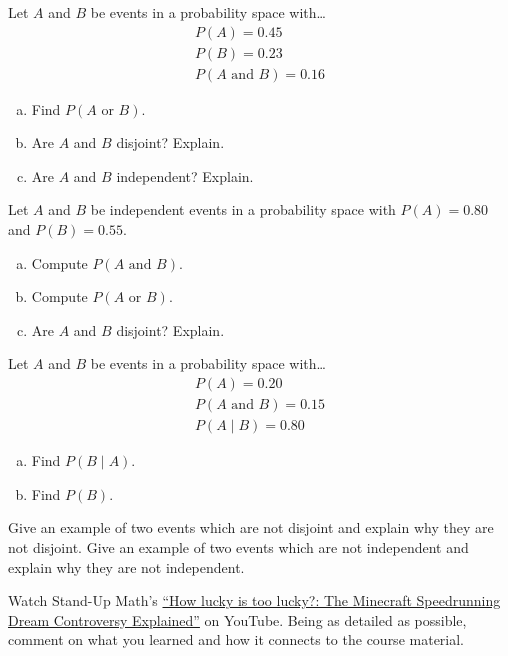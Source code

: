 \documentclass[11pt,letterpaper]{article}
\begin{document}

 Let $A$ and $B$ be events in a probability space with\dots
	\[
	\begin{gathered}
	P(A)= 0.45 \\
	P(B)= 0.23 \\
	P(A \text{ and } B)= 0.16
	\end{gathered}
	\]

\begin{enumerate}[(a)]
\item Find $P(A \text{ or } B)$.
\item Are $A$ and $B$ disjoint? Explain. 
\item Are $A$ and $B$ independent? Explain. 
\end{enumerate}



\newpage



 Let $A$ and $B$ be independent events in a probability space with $P(A)= 0.80$ and $P(B)= 0.55$. 
	\begin{enumerate}[(a)]
	\item Compute $P(A \text{ and } B)$.
	\item Compute $P(A \text{ or } B)$.
	\item Are $A$ and $B$ disjoint? Explain. 
	\end{enumerate}



\newpage



 Let $A$ and $B$ be events in a probability space with\dots
	\[
	\begin{gathered}
	P(A)= 0.20 \\
	P(A \text{ and } B)= 0.15 \\
	P(A \;|\; B)= 0.80 
	\end{gathered}
	\]

\begin{enumerate}[(a)]
\item Find $P(B \;|\; A)$.
\item Find $P(B)$. 
\end{enumerate}



\newpage



 Give an example of two events which are not disjoint and explain why they are not disjoint. Give an example of two events which are not independent and explain why they are not independent. 



\newpage



 Watch Stand-Up Math's \href{https://www.youtube.com/watch?v=8Ko3TdPy0TU&pp=ygUWaG93IGx1Y2t5IGlzIHRvbyBsdWNreQ\%3D\%3D}{``How lucky is too lucky?: The Minecraft Speedrunning Dream Controversy Explained''} on YouTube. Being as detailed as possible, comment on what you learned and how it connects to the course material. 
\end{document}
